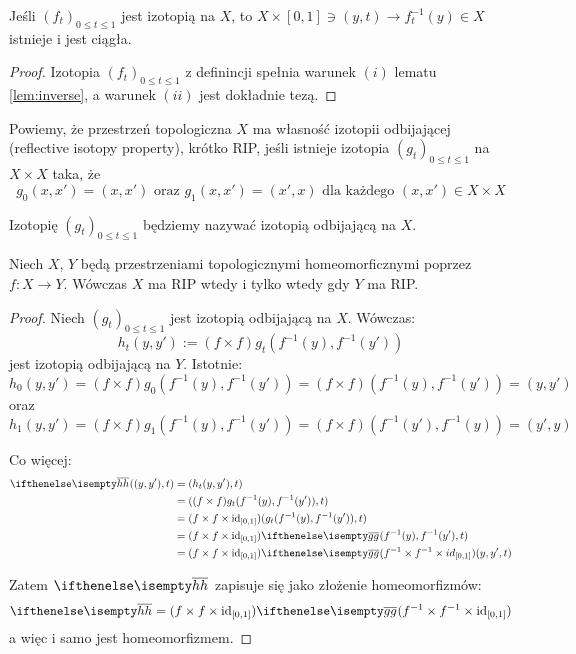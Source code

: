\begin{cor} \label{cor:isotopy-inverse}
  Jeśli $(f_t)_{0 \leq t \leq 1}$ jest izotopią na $X$, to $X \times [0,1] \ni (y, t) \rightarrow f_t^{-1}(y) \in X$ istnieje i jest ciągła.
  \begin{proof}
    Izotopia $(f_t)_{0 \leq t \leq 1}$ z definincji spełnia warunek $(i)$ lematu \ref{lem:inverse}, a warunek $(ii)$ jest dokładnie tezą.
  \end{proof}
\end{cor}

\begin{df}
  Powiemy, że przestrzeń topologiczna $X$ ma własność izotopii odbijającej (reflective isotopy property), krótko RIP, jeśli istnieje izotopia $(g_t)_{0 \leq t \leq 1}$ na $X \times X$ taka, że
  \[g_0(x, x') = (x, x') \mbox{ oraz } g_1(x, x') = (x', x) \mbox{ dla każdego } (x, x') \in X \times X\]
  
  Izotopię $(g_t)_{0 \leq t \leq 1}$ będziemy nazywać izotopią odbijającą na $X$.
\end{df}

\begin{ex}
  Niech $X$, $Y$ będą przestrzeniami topologicznymi homeomorficznymi poprzez $f: X \rightarrow Y$. Wówczas $X$ ma RIP wtedy i tylko wtedy gdy $Y$ ma RIP.
  \begin{proof}
    Niech $(g_t)_{0 \leq t \leq 1}$ jest izotopią odbijającą na $X$. Wówczas:
    \[h_t(y, y') := (f \times f) g_t(f^{-1}(y), f^{-1}(y'))\]
    jest izotopią odbijającą na $Y$. Istotnie:
    \[h_0(y,y') = (f \times f) g_0(f^{-1}(y), f^{-1}(y')) = (f \times f)(f^{-1}(y), f^{-1}(y')) = (y, y')\]
    oraz
    \[h_1(y,y') = (f \times f) g_1(f^{-1}(y), f^{-1}(y')) = (f \times f)(f^{-1}(y'), f^{-1}(y)) = (y', y)\]
    
    Co więcej:
    \begin{align*}
      \cl{h}((y, y'), t) & = (h_t(y,y'), t) \\
      & = ((f \times f)g_t(f^{-1}(y), f^{-1}(y')), t) \\
      & = (f \times f \times \id_{[0,1]}) (g_t(f^{-1}(y), f^{-1}(y')), t) \\
      & = (f \times f \times \id_{[0,1]}) \cl{g} (f^{-1}(y), f^{-1}(y'), t) \\
      & = (f \times f \times \id_{[0,1]}) \cl{g} (f^{-1} \times f^{-1} \times id_{[0,1]})(y, y', t) 
    \end{align*}
    
    Zatem $\cl{h}$ zapisuje się jako złożenie homeomorfizmów:
    \[\cl{h} = (f \times f \times \id_{[0,1]}) \cl{g} (f^{-1} \times f^{-1} \times \id_{[0,1]})\]
    a więc i samo jest homeomorfizmem.
  \end{proof}
\end{ex}

